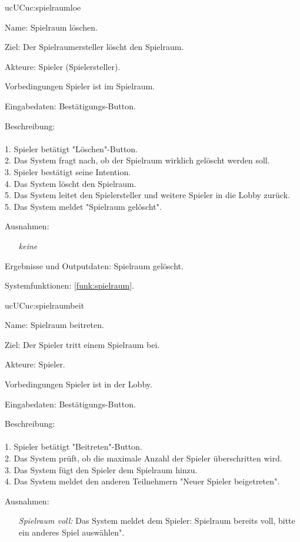 \begin{description}[leftmargin=5em, style=sameline]
	\begin{lhp}{uc}{UC}{uc:spielraumloe}
		\item [Name:] Spielraum löschen.
		\item [Ziel:] Der Spielraumersteller löscht den Spielraum.
		\item [Akteure:] Spieler (Spielersteller).
		\item [Vorbedingungen] Spieler ist im Spielraum.
		\item [Eingabedaten:] Bestätigungs-Button.
		\item [Beschreibung:] \hfill\\ \hfill\\
			1. Spieler betätigt "{}Löschen{}"{}-Button.\\
			2. Das System fragt nach, ob der Spielraum wirklich gelöscht werden soll.\\
			3. Spieler bestätigt seine Intention.\\
			4. Das System löscht den Spielraum.	\\	
			5. Das System leitet den Spielersteller und weitere Spieler in die Lobby zurück.\\	
			5. Das System meldet "{}Spielraum gelöscht{}"{}.\\
		\item [Ausnahmen:] \hfill
			\begin{itemize} 
				\item[] \textit{keine} 
			
			\end{itemize}
		\item [Ergebnisse und Outputdaten:] Spielraum gelöscht. 	
		\item [Systemfunktionen:] \ref{funk:spielraum}.
	\end{lhp}

	\begin{lhp}{uc}{UC}{uc:spielraumbeit}
		\item [Name:] Spielraum beitreten.
		\item [Ziel:] Der Spieler tritt einem Spielraum bei.
		\item [Akteure:] Spieler.
		\item [Vorbedingungen] Spieler ist in der Lobby.
		\item [Eingabedaten:] Bestätigungs-Button.
		\item [Beschreibung:] \hfill\\ \hfill\\
			1. Spieler betätigt "{}Beitreten{}"{}-Button.\\
			2. Das System prüft, ob die maximale Anzahl der Spieler überschritten wird.\\
			3. Das System fügt den Spieler dem Spielraum hinzu.\\	
			4. Das System meldet den anderen Teilnehmern "{}Neuer Spieler beigetreten{}"{}.\\
		\item [Ausnahmen:] \hfill
			\begin{itemize} 
				\item[] \textit{Spielraum voll:} Das System meldet dem Spieler:{} {}Spielraum bereits voll, bitte ein anderes Spiel auswählen{}"{}.
				

\end{itemize}
\end{lhp}
\end{description}

